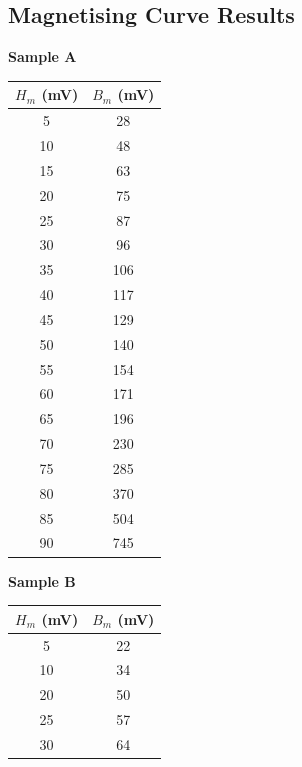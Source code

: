 \documentclass{article}
\begin{document}
\subsection{Magnetising Curve Results}
\begin{table}[h]
	\centering
	\begin{minipage}{0.48\textwidth}
		\centering
		\textbf{Sample A}\\[0.5em]
		\begin{tabular}{cc}
			\toprule
			$H_m$ (mV) & $B_m$ (mV) \\
			\midrule
			5          & 28         \\
			10         & 48         \\
			15         & 63         \\
			20         & 75         \\
			25         & 87         \\
			30         & 96         \\
			35         & 106        \\
			40         & 117        \\
			45         & 129        \\
			50         & 140        \\
			55         & 154        \\
			60         & 171        \\
			65         & 196        \\
			70         & 230        \\
			75         & 285        \\
			80         & 370        \\
			85         & 504        \\
			90         & 745        \\
			\bottomrule
		\end{tabular}
	\end{minipage}%
	\hfill
	\begin{minipage}{0.48\textwidth}
		\centering
		\textbf{Sample B}\\[0.5em]
		\begin{tabular}{cc}
			\toprule
			$H_m$ (mV) & $B_m$ (mV) \\
			\midrule
			5          & 22         \\
			10         & 34         \\
			20         & 50         \\
			25         & 57         \\
			30         & 64         \\

\end{tabular}
\end{minipage}
\end{table}
\end{document}
